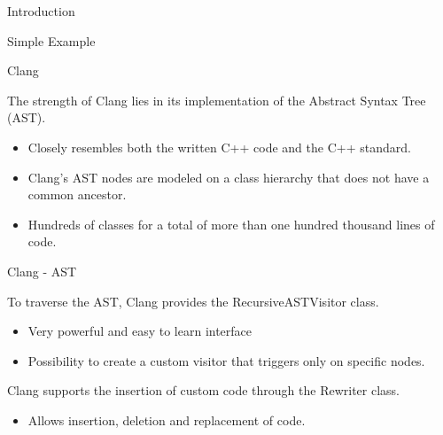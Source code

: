 \documentclass[xcolor=dvipsnames]{beamer}
\begin{document}
\begin{section}{Introduction}
\begin{frame}[fragile]{\hskip 0.3cm Simple Example}
\end{frame}


















\begin{frame}{\hskip 0.3cm Clang}


The strength of Clang lies in its implementation of the Abstract Syntax Tree (AST).
\begin{itemize}

\item Closely resembles both the written C++ code and the C++ standard.

\item Clang’s AST nodes are modeled on a class hierarchy that does not have a common ancestor.

\item Hundreds of classes for a total of more than one hundred thousand lines of code.

\end{itemize}
\end{frame}
















\begin{frame}{\hskip 0.3cm Clang - AST}

To traverse the AST, Clang provides the RecursiveASTVisitor class.
\begin{itemize}

\item Very powerful and easy to learn interface

\item Possibility to create a custom visitor that triggers only on specific nodes.


\end{itemize}

Clang supports the insertion of custom code through the Rewriter class.
\begin{itemize}

\item Allows insertion, deletion and replacement of code.


\end{itemize}
\end{frame}
\end{section}
\end{document}
